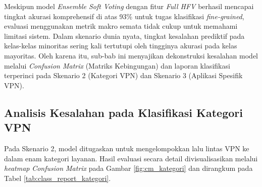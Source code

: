 Meskipun model \textit{Ensemble Soft Voting} dengan fitur \textit{Full HFV} berhasil mencapai tingkat akurasi komprehensif di atas 93\% untuk tugas klasifikasi \textit{fine-grained}, evaluasi menggunakan metrik makro semata tidak cukup untuk memahami limitasi sistem. Dalam skenario dunia nyata, tingkat kesalahan prediktif pada kelas-kelas minoritas sering kali tertutupi oleh tingginya akurasi pada kelas mayoritas. Oleh karena itu, sub-bab ini menyajikan dekonstruksi kesalahan model melalui \textit{Confusion Matrix} (Matriks Kebingungan) dan laporan klasifikasi terperinci pada Skenario 2 (Kategori VPN) dan Skenario 3 (Aplikasi Spesifik VPN).

\subsection{Analisis Kesalahan pada Klasifikasi Kategori VPN}

Pada Skenario 2, model ditugaskan untuk mengelompokkan lalu lintas VPN ke dalam enam kategori layanan. Hasil evaluasi secara detail divisualisasikan melalui \textit{heatmap} \textit{Confusion Matrix} pada Gambar \ref{fig:cm_kategori} dan dirangkum pada Tabel \ref{tab:class_report_kategori}.

\begin{table}[htbp]
    \centering
    \footnotesize
    \caption{Laporan klasifikasi terperinci - skenario 2 (kategori VPN).}
    \label{tab:class_report_kategori}
\end{table}

